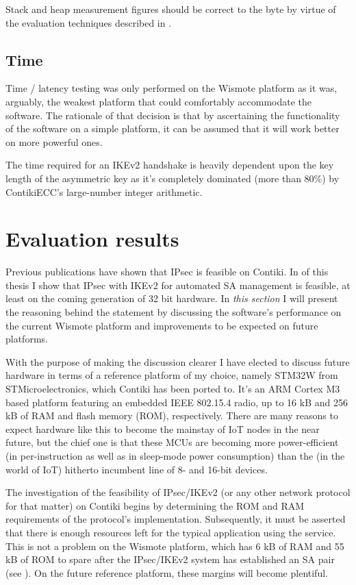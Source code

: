 \documentclass[final,a4paper,twoside,11pt,onecolumn]{report}
\begin{document}
Stack and heap measurement figures should be correct to the byte by virtue of the evaluation techniques described in .

\subsection{Time}
Time / latency testing was only performed on the Wismote platform as it was, arguably, the weakest platform that could comfortably accommodate the software. The rationale of that decision is that by ascertaining the functionality of the software on a simple platform, it can be assumed that it will work better on more powerful ones.

The time required for an IKEv2 handshake is heavily dependent upon the key length of the asymmetric key as it's completely dominated (more than 80\%) by ContikiECC's large-number integer arithmetic.


\section{Evaluation results}
\label{sec:evalresults}
Previous publications\cite{raza11securing} have shown that IPsec is feasible on Contiki. In  of this thesis I show that IPsec with IKEv2 for automated SA management is feasible, at least on the coming generation of 32 bit hardware. In \emph{this section} I will present the reasoning behind the statement by discussing the software's performance on the current Wismote platform and improvements to be expected on future platforms.

With the purpose of making the discussion clearer I have elected to discuss future hardware in terms of a reference platform of my choice, namely STM32W from STMicroelectronics, which Contiki has been ported to. It's an ARM Cortex M3 based platform featuring an embedded IEEE 802.15.4 radio, up to 16 kB and 256 kB of RAM and flash memory (ROM), respectively. There are many reasons to expect hardware like this to become the mainstay of IoT nodes in the near future, but the chief one is that these MCUs are becoming more power-efficient\cite{ko2012low} (in per-instruction as well as in sleep-mode power consumption) than the (in the world of IoT) hitherto incumbent line of 8- and 16-bit devices.

The investigation of the feasibility of IPsec/IKEv2 (or any other network protocol for that matter) on Contiki begins by determining the ROM and RAM requirements of the protocol's implementation. Subsequently, it must be asserted that there is enough resources left for the typical application using the service. This is not a problem on the Wismote platform, which has 6 kB of RAM and 55 kB of ROM to spare after the IPsec/IKEv2 system has established an SA pair (see ). On the future reference platform, these margins will become plentiful.
\end{document}
